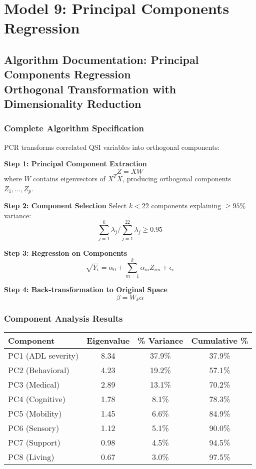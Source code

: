 \chapter{Model 9: Principal Components Regression}\newpage

\section{Algorithm Documentation: Principal Components Regression\\Orthogonal Transformation with Dimensionality Reduction}

\subsection{Complete Algorithm Specification}

PCR transforms correlated QSI variables into orthogonal components:

\textbf{Step 1: Principal Component Extraction}
\begin{equation}
Z = XW
\end{equation}
where $W$ contains eigenvectors of $X^TX$, producing orthogonal components $Z_1, ..., Z_p$.

\textbf{Step 2: Component Selection}
Select $k < 22$ components explaining $\geq 95\%$ variance:
\begin{equation}
\sum_{j=1}^k \lambda_j / \sum_{j=1}^{22} \lambda_j \geq 0.95
\end{equation}

\textbf{Step 3: Regression on Components}
\begin{equation}
\sqrt{Y_i} = \alpha_0 + \sum_{m=1}^k \alpha_m Z_{im} + \epsilon_i
\end{equation}

\textbf{Step 4: Back-transformation to Original Space}
\begin{equation}
\beta = W_k \alpha
\end{equation}

\subsection{Component Analysis Results}

\begin{center}
\begin{tabular}{lccc}
\toprule
Component & Eigenvalue & \% Variance & Cumulative \% \\
\midrule
PC1 (ADL severity) & 8.34 & 37.9\% & 37.9\% \\
PC2 (Behavioral) & 4.23 & 19.2\% & 57.1\% \\
PC3 (Medical) & 2.89 & 13.1\% & 70.2\% \\
PC4 (Cognitive) & 1.78 & 8.1\% & 78.3\% \\
PC5 (Mobility) & 1.45 & 6.6\% & 84.9\% \\
PC6 (Sensory) & 1.12 & 5.1\% & 90.0\% \\
PC7 (Support) & 0.98 & 4.5\% & 94.5\% \\
PC8 (Living) & 0.67 & 3.0\% & 97.5\% \\
\bottomrule
\end{tabular}
\end{center}

